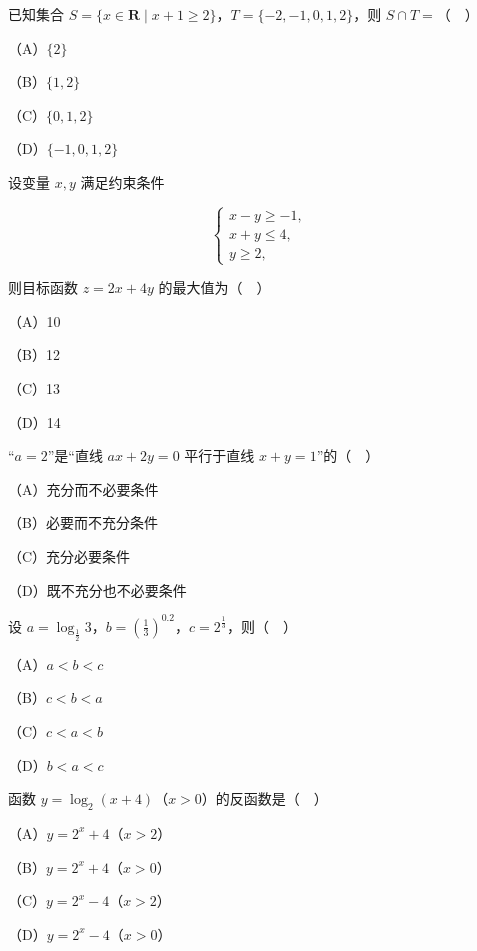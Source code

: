 


\begin{question}
已知集合 $S=\{x\in\mathbf R\mid x+1\geqslant 2\}$，$T=\{-2,-1,0,1,2\}$，则 $S\cap T=$（　）

（A）$\{2\}$

（B）$\{1,2\}$

（C）$\{0,1,2\}$

（D）$\{-1,0,1,2\}$

\end{question}
\begin{question}
设变量 $x,y$ 满足约束条件

\nopagebreak[4]
\[\begin{cases}x-y\geqslant -1,\\ x+y\leqslant 4,\\ y\geqslant 2,\end{cases}\]

则目标函数 $z=2x+4y$ 的最大值为（　）

（A）10

（B）12

（C）13

（D）14

\end{question}
\begin{question}
“$a=2$”是“直线 $ax+2y=0$ 平行于直线 $x+y=1$”的（　）

（A）充分而不必要条件

（B）必要而不充分条件

（C）充分必要条件

（D）既不充分也不必要条件

\end{question}
\begin{question}
设 $a=\log_{\frac12}3$，$b=\left(\frac13\right)^{0.2}$，$c=2^{\frac13}$，则（　）

（A）$a<b<c$

（B）$c<b<a$

（C）$c<a<b$

（D）$b<a<c$

\end{question}
\begin{question}
函数 $y=\log_2(x+4)$（$x>0$）的反函数是（　）

（A）$y=2^x+4$（$x>2$）

（B）$y=2^x+4$（$x>0$）

（C）$y=2^x-4$（$x>2$）

（D）$y=2^x-4$（$x>0$）

\end{question}
